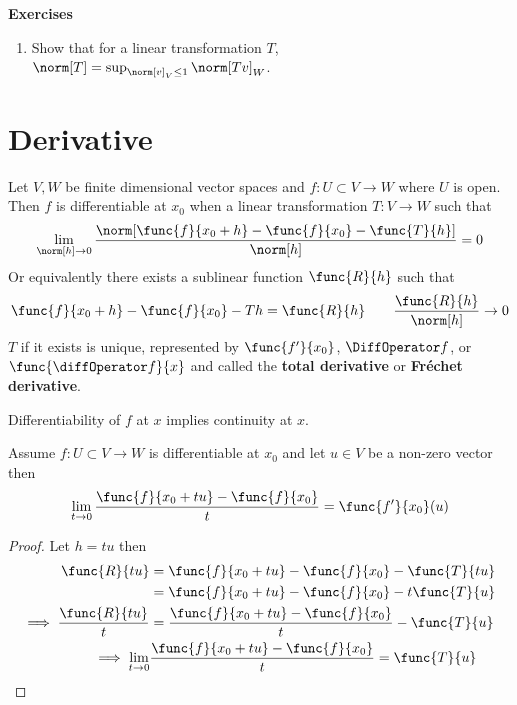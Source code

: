 {\Large\textbf{Exercises}}
\begin{enumerate}
    \item Show that for a linear transformation \(T\), \(\norm[T] = \sup_{\norm[v]_V \leq 1} \norm[Tv]_W\).
\end{enumerate}
\newpage

\section{Derivative}
Let \(V,W\) be finite dimensional vector spaces and \(f: U \subset V \to W\) where \(U\) is open. Then \(f\) is differentiable at \(x_0\) when a linear transformation \(T : V \to W\) such that
\begin{equation*}
    \lim_{\norm[h] \to 0} \dfrac{\norm[\func{f}{x_0 + h} - \func{f}{x_0} - \func{T}{h}]}{\norm[h]}= 0
\end{equation*}
Or equivalently there exists a sublinear function \(\func{R}{h}\) such that
\begin{equation*}
    \func{f}{x_0 + h} - \func{f}{x_0} - Th = \func{R}{h} \qquad \frac{\func{R}{h}}{\norm[h]} \to 0
\end{equation*}
\(T\) if it exists is unique, represented by \(\func{f'}{x_0}\), \(\DiffOperator f\), or \(\func{\diffOperator f}{x}\) and called the \textbf{total derivative} or \textbf{Fr\'{e}chet derivative}.

\begin{proposition}
    Differentiability of \(f\) at \(x\) implies continuity at \(x\).
\end{proposition}

\begin{proposition} \label{eq:partialDerivative}
    Assume \(f: U \subset V \to W\) is differentiable at \(x_0\) and let \(u \in V\) be a non-zero vector then
    \begin{equation*}
        \lim_{t \to 0} \dfrac{\func{f}{x_0 + tu} - \func{f}{x_0}}{t} =\func{f'}{x_0} (u)
    \end{equation*}
\end{proposition}

\begin{proof}
    Let \(h = tu\) then
    \begin{align*}
        \func{R}{tu}                     & = \func{f}{x_0 + tu} - \func{f}{x_0} - \func{T}{tu}            \\
                                         & = \func{f}{x_0 + tu} - \func{f}{x_0} - t\func{T}{u}            \\
        \implies \dfrac{\func{R}{tu}}{t} & = \dfrac{ \func{f}{x_0 + tu} - \func{f}{x_0}}{t} - \func{T}{u} \\
        \implies \lim_{t \to 0}          & \dfrac{ \func{f}{x_0 + tu} - \func{f}{x_0}}{t} = \func{T}{u}
    \end{align*}
\end{proof}

